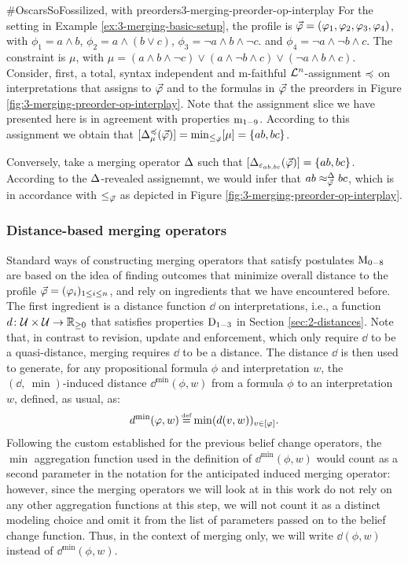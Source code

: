 \begin{xmpl}{$\#$OscarsSoFossilized, with preorders}{3-merging-preorder-op-interplay}
	For the setting in Example \ref{ex:3-merging-basic-setup},
	the profile is $\P=(\phi_{1},\phi_{2}, \phi_{3}, \phi_{4})$,
	with
	$\phi_1 = a\land b$,
	$\phi_2 = a\land (b\lor c)$,
	$\phi_3 = \lnot a\land b \land \lnot c$.
	and
	$\phi_4 = \lnot a \land\lnot b\land c$.
	The constraint is $\mu$, 
	with
	$\mu=(a\land b\land \lnot c)\lor (a\land\lnot b\land c)\lor(\lnot a\land b\land c)$.
	Consider, first,
	a total, syntax independent and m-faithful 
	$\L^n$-assignment $\as$ on interpretations
	that assigns to $\P$ and to the formulas in $\P$
	the preorders in Figure \ref{fig:3-merging-preorder-op-interplay}.
	Note that the assignment slice we have presented here 
	is in agreement with properties $\oom{1-9}$.
	According to this assignment
	we obtain that 
	$[\me^{\as}_{\mu}(\P)]=\min_{\le_{\P}}[\mu]=\{ab,bc\}$.

	Conversely, take a merging operator $\me$ such that 
	$[\me_{\px_{ab,bc}}(\P)]=\{ab,bc\}$.
	According to the $\me$-revealed assignemnt,
	we would infer that $ab \approx^{\me}_{\P} bc$,
	which is in accordance with $\le_{\P}$
	as depicted in Figure \ref{fig:3-merging-preorder-op-interplay}.
\end{xmpl}

\subsubsection{Distance-based merging operators}
Standard ways of constructing merging operators 
that satisfy postulates $\ppm{0-8}$
are based on the idea of finding outcomes 
that minimize overall distance to the profile $\P=(\phi_i)_{1\le i \le n}$,
and rely on ingredients that we have encountered before.
The first ingredient is a distance function $\dd$
on interpretations, i.e., a function 
$\dd\colon\U\times\U\rightarrow\mathbb{R}_{\geq 0}$
that satisfies properties $\ood{1-3}$ 
in Section \ref{sec:2-distances}.
Note that, in contrast to revision, update and enforcement,
which only require $\dd$ to be a quasi-distance,
merging requires $\dd$ to be a distance.
The distance $\dd$ 
is then used to generate,
for any propositional formula $\phi$ and interpretation $w$,
the $(\dd,\:\min)$-induced distance $\dd^{\min}(\phi,w)$ 
from a formula $\phi$ to an interpretation $w$,
defined, as usual, as:
$$
	\dd^{\min}(\phi,w)\defeq\min(\dd(v,w))_{v\in[\phi]}.
$$
Following the custom established for the previous belief change 
operators, the $\min$ aggregation function used in the definition
of $\dd^{\min}(\phi,w)$ would count as a second parameter in the 
notation for the anticipated induced merging operator:
however, since the merging operators we will look at in this work
do not rely on any other aggregation functions at this step, 
we will not count it as a distinct modeling choice and
omit it from the list of parameters passed on to the belief change 
function. 
Thus, in the context of merging only, 
we will write $\dd(\phi,w)$ instead of $\dd^{\min}(\phi,w)$.

